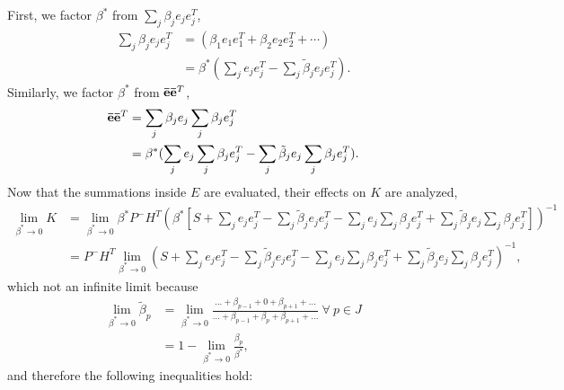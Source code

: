 \documentclass[letterpaper, paper,10pt]{AAS}		%
\begin{document}
\begin{appendix}
First, we factor $\beta^*$ from $\sum\limits_{j} \beta_{j}e_{j}e_{j}^T$,
\begin{align}
\sum\limits_{j} \beta_{j}e_{j}e_{j}^T&=(\beta_1e_1e_1^T+\beta_2e_2e_2^T+\cdots)\nonumber
\\
&=\beta^*(\sum\limits_{j}e_{j}e_{j}^T-\sum\limits_{j}\tilde\beta_je_{j}e_{j}^T).
\end{align}
Similarly, we factor $\beta^*$ from ${{\bf\bar{e}}}{\bf\bar{e}}^T$,
\begin{align}
{{\bf\bar{e}}}{\bf\bar{e}}^T&=\sum\limits_{j} \beta_{j}e_{j}\sum\limits_{j} \beta_{j}e_{j}^T\nonumber%
\\
&=\beta^*(\sum\limits_{j}e_{j}\sum\limits_{j}\beta_je_{j}^T-\sum\limits_{j}\tilde\beta_je_{j}\sum\limits_{j}\beta_je_{j}^T).
\end{align}
Now that the summations inside $E$ are evaluated, their effects on $K$ are analyzed,
\begin{align}
\lim_{\beta^* \to 0}K&=\lim_{\beta^* \to 0}\beta^*P^-H^T
(\beta^*[S+\sum\limits_{j}e_{j}e_{j}^T
-\sum\limits_{j}\tilde\beta_je_{j}e_{j}^T-\sum\limits_{j}e_{j}\sum\limits_{j}\beta_je_{j}^T+\sum\limits_{j}\tilde\beta_je_{j}\sum\limits_{j}\beta_je_{j}^T])^{-1}\nonumber
\\
&=P^-H^T\lim_{\beta^* \to 0}
(S+\sum\limits_{j}e_{j}e_{j}^T-\sum\limits_{j}\tilde\beta_je_{j}e_{j}^T-\sum\limits_{j}e_{j}\sum\limits_{j}\beta_je_{j}^T+\sum\limits_{j}\tilde\beta_je_{j}\sum\limits_{j}\beta_je_{j}^T)^{-1},
\label{eqn:OptGainNoSingularity}
\end{align}
which not an infinite limit because
\begin{align}
\lim_{\beta^* \to 0}\tilde\beta_p&=\lim_{\beta^* \to 0}\frac{...+\beta_{p-1}+0+\beta_{p+1}+...}{...+\beta_{p-1}+\beta_p+\beta_{p+1}+...}\ \forall\ p\in J\nonumber%
\\
&=1-\lim_{\beta^* \to 0}\frac{\beta_p}{\beta^*},
\end{align}
and therefore the following inequalities hold:

\end{appendix}
\end{document}
